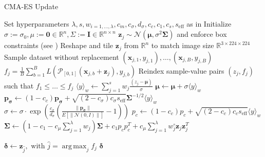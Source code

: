 \documentclass[letterpaper]{article}
\DeclareMathOperator*{\argmax}{arg\,max}
\begin{document}
	\begin{algorithm*}[t]
		\caption{CMA-ES Update}
		\label{alg:fullcmaes}
		\begin{algorithmic}[1]
			\State Set hyperparameters $\lambda, s, w_{i=1,\ldots,\lambda}, c_m, c_\sigma, d_\sigma, c_c, c_1, c_s, s_{\text{eff}}$ as in \cite[Appendix A]{hansen2016cma}
			\State Initialize $\sigma := \sigma_0, \mu := \mathbf{0} \in \mathbb{R}^n, \Sigma := \mathbf{I} \in \mathbb{R}^{n \times n} $ 
			\State $\mathbf{z}_j \sim \mathcal{N}(\boldsymbol{\mu}, \sigma^2 \bm{\Sigma})$ and enforce box constraints (see \cite{hansen2019pycma})
			\State Reshape and tile $\mathbf{z}_j$ from $\mathbb{R}^n$ to match image size $\mathbb{R}^{3 \times 224 \times 224}$
			\State Sample dataset without replacement $(\mathbf{x}_{j,1},y_{j,1}),\ldots, (\mathbf{x}_{j,B}, y_{j,B})$
			\State $f_j = \frac{1}{B}\sum_{b=1}^B L(\mathcal{P}_{[0,1]}(\mathbf{x}_{j,b} + \mathbf{z}_j), y_{j,b})$  
			\EndFor
			\State Reindex sample-value pairs $(z_j, f_j)$ such that $f_1 \leq \ldots \leq f_j$ 
			\State $\langle y \rangle_w \leftarrow \sum_{j=1}^s w_j \frac{(z_j - \mathbf{\mu})}{\sigma}$
			\State $\mathbf{\mu} \leftarrow \mathbf{\mu} + \sigma \langle y \rangle_w$
			\State $\mathbf{p_{\sigma}} \leftarrow (1 - c_c) \mathbf{p_{\sigma}} + \sqrt{(2 - c_\sigma) c_\sigma s_{\text{eff}}} \mathbf{\Sigma}^{-1/2} \langle y \rangle_w$ 
			\State $\sigma \leftarrow \sigma \cdot \exp \left( \frac{c_\sigma}{d_\sigma} \left(\frac{\|\mathbf{p_{\sigma}}\|}{E[\|\mathcal{N}(0, I)\|]} - 1 \right) \right)$ 
			\State $p_c \leftarrow (1 - c_c) p_c + \sqrt{(2 - c_c) c_c s_{\text{eff}}} \langle y \rangle_w$
			\State $\mathbf{\Sigma} \leftarrow \left(1 - c_1 - c_\mu \sum_{j=1}^\lambda w_j\right)\mathbf{\Sigma} + c_1 p_c p_c^T + c_\mu \sum_{j=1}^\lambda w_j^\circ \mathbf{z}_j \mathbf{z}_j^T$ 
			
			\State $\boldsymbol{\delta} \leftarrow \mathbf{z}_{\hat j}, \text{ with } \hat j = \argmax_j f_j$
			\EndFor
			\State \Return $\boldsymbol{\delta}$
			\EndProcedure
		\end{algorithmic}
	\end{algorithm*}
	
\end{document}
